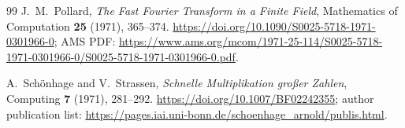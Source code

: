 \documentclass[11pt]{book}
\theoremstyle{definition}
\begin{document}
\begin{thebibliography}{99}
J.~M.~Pollard,
\emph{The Fast Fourier Transform in a Finite Field},
Mathematics of Computation \textbf{25} (1971), 365--374.
\newline
\url{https://doi.org/10.1090/S0025-5718-1971-0301966-0};
AMS PDF:
\url{https://www.ams.org/mcom/1971-25-114/S0025-5718-1971-0301966-0/S0025-5718-1971-0301966-0.pdf}.

A.~Sch\"onhage and V.~Strassen,
\emph{Schnelle Multiplikation gro\ss er Zahlen},
Computing \textbf{7} (1971), 281--292.
\newline
\url{https://doi.org/10.1007/BF02242355};
author publication list:
\url{https://pages.iai.uni-bonn.de/schoenhage_arnold/publis.html}.

\end{thebibliography}
\end{document}
